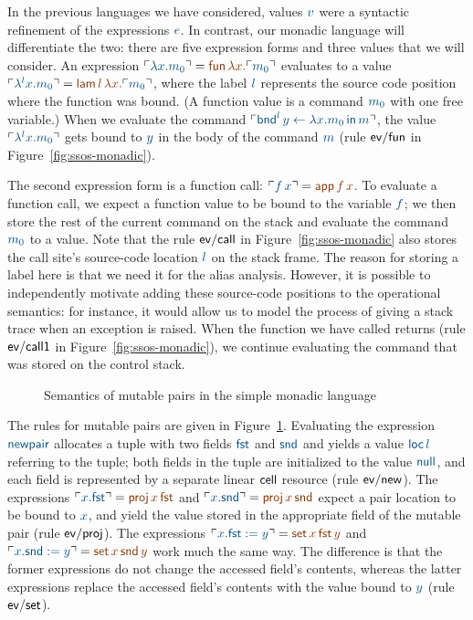 In the previous languages we have considered, values $\obj{v}$ were a
syntactic refinement of the expressions $\obj{e}$. In contrast, our monadic
language will differentiate the two: there are five expression forms
and three values that we will consider. An expression $\interp{\lambda
  x.m_0} = \lf{{\sf fun}\,\lambda x.\interp{m_0}}$ evaluates to a value
$\interp{\lambda^l x.m_0} = \lf{{\sf lam}\,l\,\lambda x.\interp{m_0}}$, where
the label $\obj{l}$ represents the source code position where the function
was bound. (A function value is a command $\obj{m_0}$ with one free variable.)
When we evaluate the command $\interp{{\sf
    bnd}^l \, y \leftarrow \lambda x.m_0 \,{\sf in}\,m}$, the value
$\interp{\lambda^l x.m_0}$ gets bound to $\obj{y}$ in the body of the command
$\obj{m}$ (rule ${\sf ev/fun}$ in Figure~\ref{fig:ssos-monadic}).

The second expression form is a function call: $\interp{f\,x} = \lf{{\sf
  app}\,f\,x}$. To evaluate a function call, we expect a function value
to be bound to the
variable $\obj{f}$; we then store the rest of the current command on the
stack and evaluate the command $\obj{m_0}$ to a value. Note that the rule
${\sf ev/call}$ in Figure~\ref{fig:ssos-monadic} also stores the call
site's source-code location $\obj{l}$ on the stack frame. The reason for
storing a label here is that we need it for the alias
analysis. However, it is possible to independently motivate adding
these source-code positions to the operational semantics: for instance, it
would allow us to model the process of giving a stack trace when an
exception is raised. When the function we have called returns (rule
${\sf ev/call1}$ in Figure~\ref{fig:ssos-monadic}), we continue
evaluating the command that was stored on the control stack.

\begin{figure}
\caption{Semantics of mutable pairs in the simple monadic language}
\label{fig:ssos-monadic2}
\end{figure}

The rules for mutable pairs are given in
Figure~\ref{fig:ssos-monadic2}. Evaluating the expression $\obj{\sf
  newpair}$ allocates a tuple with two fields $\obj{\sf fst}$ and 
$\obj{\sf
  snd}$ and yields a value $\obj{{\sf loc}\,l}$ referring to the tuple; both
fields in the tuple are initialized to the value $\obj{\sf null}$, and
each field is represented by a separate linear ${\sf cell}$ resource
(rule ${\sf ev/new}$). The expressions $\interp{x.{\sf fst}} = \lf{{\sf
  proj}\,x\,{\sf fst}}$ and $\interp{x.{\sf snd}} = \lf{{\sf proj}\,x\,{\sf
  snd}}$ expect a pair location to be bound to $\obj{x}$, and yield the value
stored in the appropriate field of the mutable pair (rule ${\sf
  ev/proj}$). The expressions $\interp{x.{\sf fst} := y} = \lf{{\sf
  set}\,x\,{\sf fst}\,y}$ and $\interp{x.{\sf snd} := y} = \lf{{\sf
  set}\,x\,{\sf snd}\,y}$ work much the same way. The difference is
that the former expressions do not change the accessed field's
contents, whereas the latter expressions replace the accessed field's
contents with the value bound to $\obj{y}$ (rule ${\sf ev/set}$).

